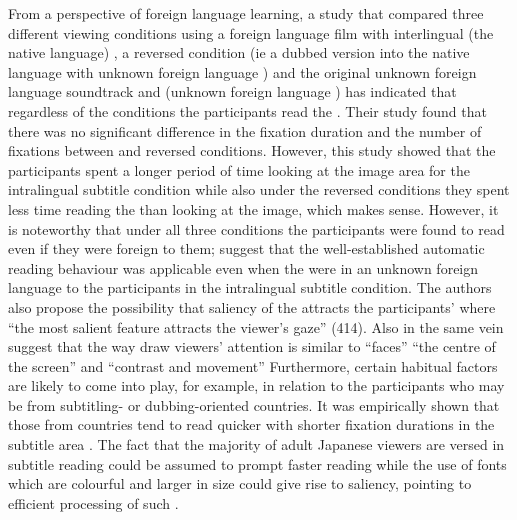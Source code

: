 \documentclass[output=paper]{langsci/langscibook}
\begin{document}
From a perspective of foreign language learning, a study \citep{bisson2014} that compared three different viewing conditions using a foreign language film with interlingual (the native language) , a reversed condition (ie a dubbed version into the native language with unknown foreign language ) and the original unknown foreign language soundtrack and  (unknown foreign language ) has indicated that regardless of the conditions the participants read the . Their study found that there was no significant difference in the fixation duration and the number of fixations between  and reversed conditions. However, this study showed that the participants spent a longer period of time looking at the image area for the intralingual subtitle condition while also under the reversed conditions they spent less time reading the  than looking at the image, which makes sense. However, it is noteworthy that under all three conditions the participants were found to read  even if they were foreign to them; \citet[414]{bisson2014} suggest that the well-established automatic reading behaviour was applicable even when the  were in an unknown foreign language to the participants in the intralingual subtitle condition. The authors also propose the possibility that saliency of the  attracts the participants'  where ``the most salient feature attracts the viewer's gaze'' (414).  Also in the same vein \citet[n.p.]{Kruger2015} suggest that the way  draw viewers' attention is similar to ``faces'' ``the centre of the screen'' and ``contrast and movement''  Furthermore, certain habitual factors are likely to come into play, for example, in relation to the participants who may be from subtitling- or dubbing-oriented countries. It was empirically shown that those from  countries tend to read  quicker with shorter fixation durations in the subtitle area \citep{Bruycker2007}.  The fact that the majority of adult Japanese viewers are versed in subtitle reading could be assumed to prompt faster reading while the use of fonts which are colourful and larger in size could give rise to saliency, pointing to efficient processing of such .   
\end{document}

